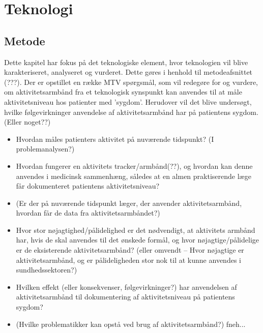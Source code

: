 \chapter{Teknologi}
\section{Metode}
Dette kapitel har fokus på det teknologiske element, hvor teknologien vil blive karakteriseret, analyseret og vurderet. Dette gøres i henhold til metodeafsnittet (???). Der er opstillet en række MTV spørgsmål, som vil redegøre for og vurdere, om aktivitetsarmbånd fra et teknologisk synspunkt kan anvendes til at måle aktivitetsniveau hos patienter med ’sygdom’. Herudover vil det blive undersøgt, hvilke følgevirkninger anvendelse af aktivitetsarmbånd har på patientens sygdom. (Eller noget??)
\begin{itemize}
\item Hvordan måles patienters aktivitet på nuværende tidspunkt? (I problemanalysen?)
\item Hvordan fungerer en aktivitets tracker/armbånd(??), og hvordan kan denne anvendes i medicinsk sammenhæng, således at en almen praktiserende læge får dokumenteret patientens aktivitetsniveau?
\item (Er der på nuværende tidspunkt læger, der anvender aktivitetsarmbånd, hvordan får de data fra aktivitetsarmbåndet?)
\item Hvor stor nøjagtighed/pålidelighed er det nødvendigt, at aktivitets armbånd har, hvis de skal anvendes til det ønskede formål, og hvor nøjagtige/pålidelige er de eksisterende aktivitetsarmbånd? (eller omvendt – Hvor nøjagtige er aktivitetsarmbånd, og er pålideligheden stor nok til at kunne anvendes i sundhedssektoren?)
\item Hvilken effekt (eller konsekvenser, følgevirkninger?) har anvendelsen af aktivitetsarmbånd til dokumentering af aktivitetsniveau på patientens sygdom?
\item (Hvilke problematikker kan opstå ved brug af aktivitetsarmbånd?) fneh...

\end{itemize}








